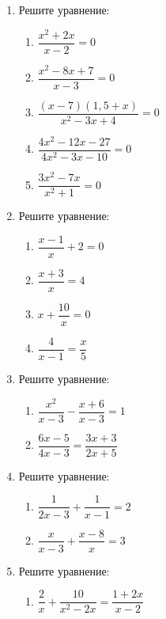 \documentclass[12pt, a4paper]{article}
\begin{document}
\begin{enumerate}
	\item Решите уравнение:
	\begin{multicols}{2}
		\begin{enumerate}[label=\asbuk*)]
			\item $\dfrac{x^2+2x}{x-2}=0$
			\item $\dfrac{x^2-8x+7}{x-3}=0$
			\item $\dfrac{(x-7)(1,5+x)}{x^2-3x+4}=0$
			\item $\dfrac{4x^2-12x-27}{4x^2-3x-10}=0$
			\item $\dfrac{3x^2-7x}{x^2+1}=0$
		\end{enumerate}
	\end{multicols}
	\item Решите уравнение:
	\begin{multicols}{2}
		\begin{enumerate}[label=\asbuk*)]
			\item $\dfrac{x-1}{x}+2=0$
			\item $\dfrac{x+3}{x}=4$
			\item $x+\dfrac{10}{x}=0$
			\item $\dfrac{4}{x-1}=\dfrac{x}{5}$
		\end{enumerate}
	\end{multicols}
	\newpage
	\item Решите уравнение:
	\begin{multicols}{2}
		\begin{enumerate}[label=\asbuk*)]
			\item $\dfrac{x^2}{x-3}-\dfrac{x+6}{x-3}=1$
			\item $\dfrac{6x-5}{4x-3}=\dfrac{3x+3}{2x+5}$
		\end{enumerate}
	\end{multicols}
	\item Решите уравнение:
	\begin{multicols}{2}
		\begin{enumerate}[label=\asbuk*)]
			\item $\dfrac{1}{2x-3}+\dfrac{1}{x-1}=2$
			\item $\dfrac{x}{x-3}+\dfrac{x-8}{x}=3$
		\end{enumerate}
	\end{multicols}
	\item Решите уравнение:
	\begin{multicols}{2}
		\begin{enumerate}[label=\asbuk*)]
			\item $\dfrac{2}{x}+\dfrac{10}{x^2-2x}=\dfrac{1+2x}{x-2}$

\end{enumerate}
\end{multicols}
\end{enumerate}
\end{document}
